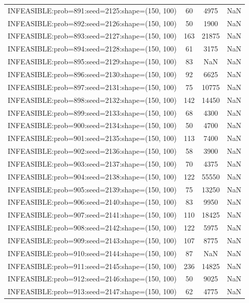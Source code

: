 \begin{longtable}{lccc}
INFEASIBLE:prob=891:seed=2125:shape=(150, 100) &    60 &  4975 &    NaN \\
INFEASIBLE:prob=892:seed=2126:shape=(150, 100) &    50 &  1900 &    NaN \\
INFEASIBLE:prob=893:seed=2127:shape=(150, 100) &   163 & 21875 &    NaN \\
INFEASIBLE:prob=894:seed=2128:shape=(150, 100) &    61 &  3175 &    NaN \\
INFEASIBLE:prob=895:seed=2129:shape=(150, 100) &    83 &   NaN &    NaN \\
INFEASIBLE:prob=896:seed=2130:shape=(150, 100) &    92 &  6625 &    NaN \\
INFEASIBLE:prob=897:seed=2131:shape=(150, 100) &    75 & 10775 &    NaN \\
INFEASIBLE:prob=898:seed=2132:shape=(150, 100) &   142 & 14450 &    NaN \\
INFEASIBLE:prob=899:seed=2133:shape=(150, 100) &    68 &  4300 &    NaN \\
INFEASIBLE:prob=900:seed=2134:shape=(150, 100) &    50 &  4700 &    NaN \\
INFEASIBLE:prob=901:seed=2135:shape=(150, 100) &   113 &  7400 &    NaN \\
INFEASIBLE:prob=902:seed=2136:shape=(150, 100) &    58 &  3900 &    NaN \\
INFEASIBLE:prob=903:seed=2137:shape=(150, 100) &    70 &  4375 &    NaN \\
INFEASIBLE:prob=904:seed=2138:shape=(150, 100) &   122 & 55550 &    NaN \\
INFEASIBLE:prob=905:seed=2139:shape=(150, 100) &    75 & 13250 &    NaN \\
INFEASIBLE:prob=906:seed=2140:shape=(150, 100) &    83 &  9950 &    NaN \\
INFEASIBLE:prob=907:seed=2141:shape=(150, 100) &   110 & 18425 &    NaN \\
INFEASIBLE:prob=908:seed=2142:shape=(150, 100) &   122 &  5975 &    NaN \\
INFEASIBLE:prob=909:seed=2143:shape=(150, 100) &   107 &  8775 &    NaN \\
INFEASIBLE:prob=910:seed=2144:shape=(150, 100) &    87 &   NaN &    NaN \\
INFEASIBLE:prob=911:seed=2145:shape=(150, 100) &   236 & 14825 &    NaN \\
INFEASIBLE:prob=912:seed=2146:shape=(150, 100) &    50 &  9025 &    NaN \\
INFEASIBLE:prob=913:seed=2147:shape=(150, 100) &    62 &  4775 &    NaN \\

\end{longtable}
